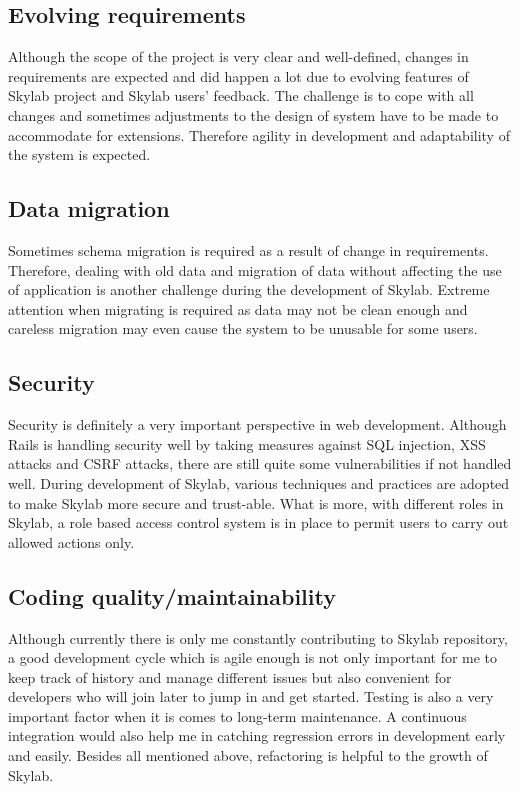 \subsection{Evolving requirements}
Although the scope of the project is very clear and well-defined, changes in requirements are expected and did happen a lot due to evolving features of Skylab project and Skylab users' feedback. The challenge is to cope with all changes and sometimes adjustments to the design of system have to be made to accommodate for extensions. Therefore agility in development and adaptability of the system is expected.

\subsection{Data migration}
Sometimes schema migration is required as a result of change in requirements. Therefore, dealing with old data and migration of data without affecting the use of application is another challenge during the development of Skylab. Extreme attention when migrating is required as data may not be clean enough and careless migration may even cause the system to be unusable for some users.

\subsection{Security}
Security is definitely a very important perspective in web development. Although Rails is handling security well by taking measures against SQL injection, XSS attacks and CSRF attacks, there are still quite some vulnerabilities if not handled well. During development of Skylab, various techniques and practices are adopted to make Skylab more secure and trust-able. What is more, with different roles in Skylab, a role based access control system is in place to permit users to carry out allowed actions only.

\subsection{Coding quality/maintainability}
Although currently there is only me constantly contributing to Skylab repository, a good development cycle which is agile enough is not only important for me to keep track of history and manage different issues but also convenient for developers who will join later to jump in and get started. Testing is also a very important factor when it is comes to long-term maintenance. A continuous integration would also help me in catching regression errors in development early and easily. Besides all mentioned above, refactoring is helpful to the growth of Skylab.

